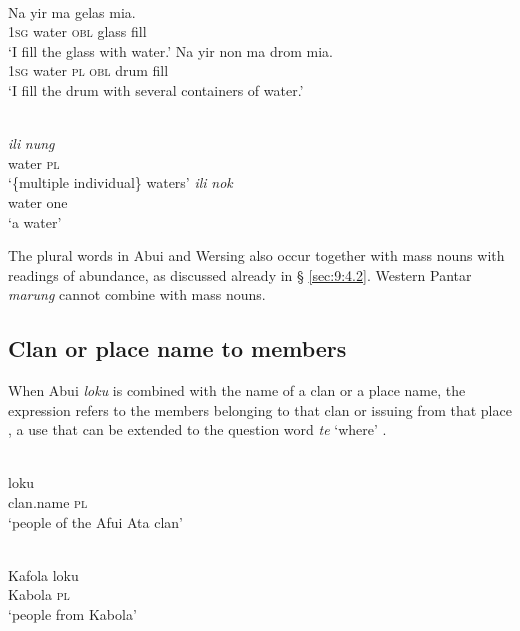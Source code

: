 \ea%
\label{ex:9:77}
 \\
\ea
\gll  Na yir ma gelas {mia}{{\textglotstop}}{.} \\
    \textsc{1sg} water \textsc{obl} glass fill \\
\glt `I fill the glass with water.'
\ex
\gll Na yir non ma drom {mia}{{\textglotstop}}{.} \\
   \textsc{1sg} water \textsc{pl} \textsc{obl} drum fill  \\
\glt  `I fill the drum with several containers of water.'
\z
\z







\ea%
\label{ex:9:78}
 \\
\ea
\gll\textit{ili} \textit{nung} \\
   water \textsc{pl} \\
 \glt `\{multiple individual\} waters' 
 \ex 
 \gll \textit{ili} \textit{nok}\\
  water one\\
\glt `a water'
\z
\z

The plural words in Abui and Wersing also occur together with mass nouns with readings of abundance, as discussed already in {\S} \ref{sec:9:4.2}. Western Pantar \textit{marung} cannot combine with mass nouns.

\subsection{Clan or place name to members}
When Abui \textit{loku} is combined with the name of a clan or a place name, the expression refers to the members belonging to that clan  or issuing from that place , a use that can be extended to the question word \textit{te} `where' .


\ea%
\label{ex:9:79}
 \\
 loku \\
   clan.name \textsc{pl}  \\
\glt `people of the Afui Ata clan'
\z







\ea%
\label{ex:9:80}
 \\
\gll  Kafola  loku \\
    Kabola  \textsc{pl} \\
\glt `people from Kabola'
\z







